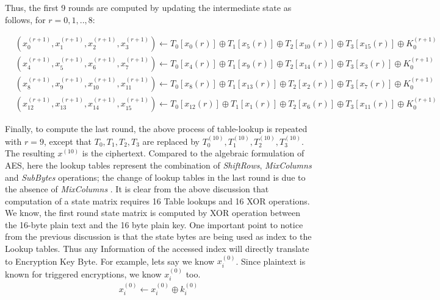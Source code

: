 \documentclass[3p]{elsarticle}
\begin{document}
\begin{flushleft}
Thus, the first 9 rounds are computed by updating the intermediate state as follows, for $r=0,1,..,8$:
\end{flushleft}
\begin{small}
\begin{align*}
&(x_0^{(r+1)},x_1^{(r+1)},x_2^{(r+1)},x_3^{(r+1)}) \gets T_0[x_0{(r)}] \oplus T_1[x_5{(r)}] \oplus T_2[x_{10}{(r)}] \oplus T_3[x_{15}{(r)}] \oplus K_0^{(r+1)}\\
&(x_4^{(r+1)},x_5^{(r+1)},x_6^{(r+1)},x_7^{(r+1)}) \gets T_0[x_4{(r)}] \oplus T_1[x_9{(r)}] \oplus T_2[x_{14}{(r)}] \oplus T_3[x_{3}{(r)}] \oplus K_0^{(r+1)}\\
&(x_8^{(r+1)},x_9^{(r+1)},x_{10}^{(r+1)},x_{11}^{(r+1)}) \gets T_0[x_8{(r)}] \oplus T_1[x_{13}{(r)}] \oplus T_2[x_{2}{(r)}] \oplus T_3[x_{7}{(r)}] \oplus K_0^{(r+1)}\\
&(x_{12}^{(r+1)},x_{13}^{(r+1)},x_{14}^{(r+1)},x_{15}^{(r+1)}) \gets T_0[x_{12}{(r)}] \oplus T_1[x_1{(r)}] \oplus T_2[x_{6}{(r)}] \oplus T_3[x_{11}{(r)}] \oplus K_0^{(r+1)}
\end{align*}
\end{small}

Finally, to compute the last round, the above process of table-lookup is repeated with $r=9$, except that $T_0,T_1,T_2,T_3$ are replaced by $T_0^{(10)},T_1^{(10)},T_2^{(10)},T_3^{(10)}$. The resulting $x^{(10)}$ is the ciphertext. Compared to the algebraic formulation of AES, here the lookup tables represent the combination of \emph{ShiftRows}, \emph{MixColumns} and \emph{SubBytes} operations; the change of lookup tables in the last round is due to the absence of \emph{MixColumns} \citep{osvik}. It is clear from the above discussion that computation of a state matrix requires 16 Table lookups and 16 XOR operations.\\

We know, the first round state matrix is computed by XOR operation between the 16-byte plain text and the 16 byte plain key. One important point to notice from the previous discussion is that the state bytes are being used as index to the Lookup tables. Thus any Information of the accessed index will directly translate to Encryption Key Byte. For example, lets say we know $x_i^{(0)}$. Since plaintext is known for triggered encryptions, we know $x_i^{(0)}$ too.\\

\begin{align*}
x_i^{(0)} \gets x_i^{(0)} \oplus k_i^{(0)}
\end{align*}
\end{document}
